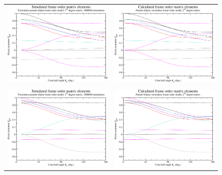\begin{figure}
\centering
  \begin{tabular}{@{}cc@{}}
    \includegraphics[width=.5\textwidth]{images/frame_order_matrix/Sijkl_pseudo-ellipse_torsionless_in_frame_theta_x_ens1000000.eps} &
    \includegraphics[width=.5\textwidth]{images/frame_order_matrix/Sijkl_pseudo-ellipse_torsionless_in_frame_theta_x_calc.eps} \\
    \\[-5pt]
    \includegraphics[width=.5\textwidth]{images/frame_order_matrix/Sijkl_pseudo-ellipse_torsionless_in_frame_theta_y_ens1000000.eps} &
    \includegraphics[width=.5\textwidth]{images/frame_order_matrix/Sijkl_pseudo-ellipse_torsionless_in_frame_theta_y_calc.eps} \\

\end{tabular}
\end{figure}
